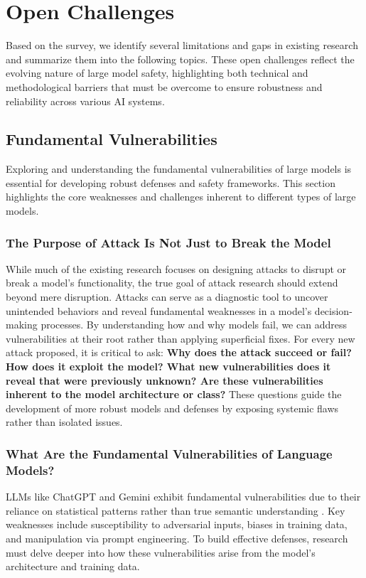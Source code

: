 \section{Open Challenges} \label{sec:challenges}

Based on the survey, we identify several limitations and gaps in existing research and summarize them into the following topics. These open challenges reflect the evolving nature of large model safety, highlighting both technical and methodological barriers that must be overcome to ensure robustness and reliability across various AI systems.

\subsection{Fundamental Vulnerabilities}

Exploring and understanding the fundamental vulnerabilities of large models is essential for developing robust defenses and safety frameworks. This section highlights the core weaknesses and challenges inherent to different types of large models.

\subsubsection{The Purpose of Attack Is Not Just to Break the Model}
While much of the existing research focuses on designing attacks to disrupt or break a model's functionality, the true goal of attack research should extend beyond mere disruption. Attacks can serve as a diagnostic tool to uncover unintended behaviors and reveal fundamental weaknesses in a model's decision-making processes. By understanding how and why models fail, we can address vulnerabilities at their root rather than applying superficial fixes. For every new attack proposed, it is critical to ask: 
\textbf{Why does the attack succeed or fail? How does it exploit the model? What new vulnerabilities does it reveal that were previously unknown? Are these vulnerabilities inherent to the model architecture or class?} 
These questions guide the development of more robust models and defenses by exposing systemic flaws rather than isolated issues.


\subsubsection{What Are the Fundamental Vulnerabilities of Language Models?}

LLMs like ChatGPT and Gemini exhibit fundamental vulnerabilities due to their reliance on statistical patterns rather than true semantic understanding \cite{titus2024does}. Key weaknesses include susceptibility to adversarial inputs, biases in training data, and manipulation via prompt engineering. To build effective defenses, research must delve deeper into how these vulnerabilities arise from the model's architecture and training data. 

